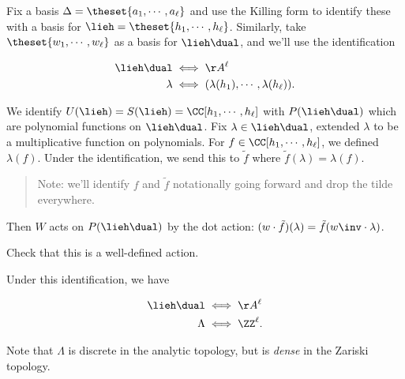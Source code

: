Fix a basis \(\Delta = \theset{a_1, \cdots, a_\ell}\) and use the
Killing form to identify these with a basis for
\(\lieh = \theset{h_1, \cdots, h_\ell}\). Similarly, take
\(\theset{w_1, \cdots, w_\ell}\) as a basis for \(\lieh\dual\), and
we'll use the identification

\begin{align*}
\lieh\dual &\iff \AA^\ell \\
\lambda &\iff (\lambda(h_1), \cdots, \lambda(h_\ell))
.\end{align*}

We identify \(U(\lieh) = S(\lieh) = \CC[h_1, \cdots, h_\ell]\) with
\(P(\lieh\dual)\) which are polynomial functions on \(\lieh\dual\). Fix
\(\lambda \in \lieh\dual\), extended \(\lambda\) to be a multiplicative
function on polynomials. For \(f\in \CC[h_1, \cdots, h_\ell]\), we
defined \(\lambda(f)\). Under the identification, we send this to
\(\tilde f\) where \(\tilde f(\lambda) = \lambda(f)\).

\begin{quote}
Note: we'll identify \(f\) and \(\tilde f\) notationally going forward
and drop the tilde everywhere.
\end{quote}

Then \(W\) acts on \(P(\lieh\dual)\) by the dot action:
\((w\cdot \tilde f)(\lambda) = \tilde f(w\inv \cdot \lambda)\).

\begin{description}
\tightlist
\item[Exercise]
Check that this is a well-defined action.
\end{description}

Under this identification, we have

\begin{align*}
\lieh\dual &\iff \AA^\ell \\
\Lambda &\iff \ZZ^\ell
.\end{align*}

Note that \(\Lambda\) is discrete in the analytic topology, but is
\emph{dense} in the Zariski topology.

